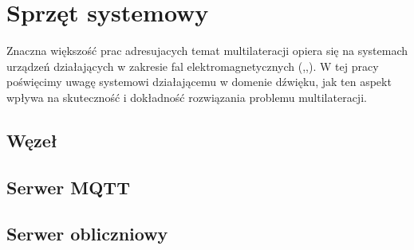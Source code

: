 \chapter{Sprzęt systemowy}

Znaczna większość prac adresujacych temat multilateracji opiera się na systemach urządzeń działających w zakresie fal elektromagnetycznych (\cite{murphy1995determination},\cite{norrdine2012algebraic},\cite{9254075}). W tej pracy poświęcimy uwagę systemowi działającemu w domenie dźwięku, jak ten aspekt wpływa na skuteczność i dokładność rozwiązania problemu multilateracji.

\section{Węzeł}

\section{Serwer MQTT}

\section{Serwer obliczniowy}
